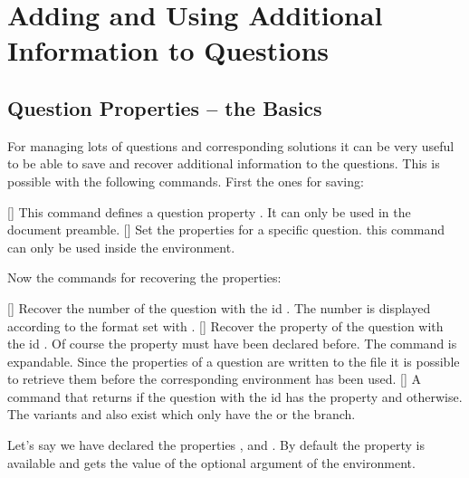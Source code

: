 \documentclass[load-preamble+]{cnltx-doc}
\begin{document}
\section{Adding and Using Additional Information to
  Questions}\label{sec:additional_info}
\subsection{Question Properties -- the Basics}

For managing lots of questions and corresponding solutions it can be very
useful to be able to save and recover additional information to the questions.
This is possible with the following commands.  First the ones for saving:
\begin{commands}
  []
    This command defines a question property .  It can only be
    used in the document preamble.
  []
    Set the properties for a specific question. this command can only be used
    inside the  environment.
\end{commands}
Now the commands for recovering the properties:
\begin{commands}
  []
    Recover the number of the question with the \acs{id} .  The
    number is displayed according to the format set with
    .
  \expandable{}[]
    Recover the property  of the question with the \acs{id}
    .  Of course the property must have been declared before.  The
    command is expandable.  Since the properties of a
    question are written to the  file it is possible to retrieve
    them before the corresponding  environment has been used.
  \expandable{}[]
    A command that returns  if the question with
    the \acs{id}  has the property  and 
    otherwise.  The variants  and
     also exist which only have the  or the
     branch.
\end{commands}
  
Let's say we have declared the properties ,  and
.  By default the property  is available and gets the
value of the optional argument of the  environment.
\end{document}
